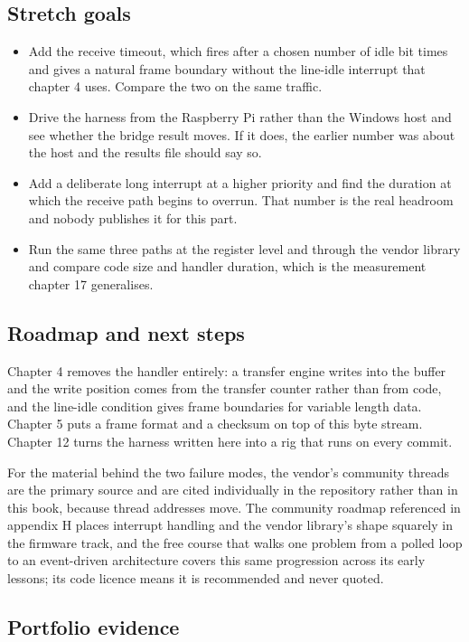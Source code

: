 \subsection*{Stretch goals}

\begin{itemize}
\item Add the receive timeout, which fires after a chosen number of idle bit
times and gives a natural frame boundary without the line-idle interrupt that
chapter 4 uses. Compare the two on the same traffic.
\item Drive the harness from the Raspberry Pi rather than the Windows host and
see whether the bridge result moves. If it does, the earlier number was about
the host and the results file should say so.
\item Add a deliberate long interrupt at a higher priority and find the duration
at which the receive path begins to overrun. That number is the real headroom
and nobody publishes it for this part.
\item Run the same three paths at the register level and through the vendor
library and compare code size and handler duration, which is the measurement
chapter 17 generalises.
\end{itemize}

\subsection*{Roadmap and next steps}

Chapter 4 removes the handler entirely: a transfer engine writes into the buffer
and the write position comes from the transfer counter rather than from code,
and the line-idle condition gives frame boundaries for variable length data.
Chapter 5 puts a frame format and a checksum on top of this byte stream.
Chapter 12 turns the harness written here into a rig that runs on every commit.

For the material behind the two failure modes, the vendor's community threads
are the primary source and are cited individually in the repository rather than
in this book, because thread addresses move. The community roadmap referenced in
appendix H places interrupt handling and the vendor library's shape squarely in
the firmware track, and the free course that walks one problem from a polled
loop to an event-driven architecture covers this same progression across its
early lessons; its code licence means it is recommended and never quoted.

\subsection*{Portfolio evidence}

